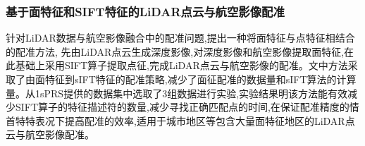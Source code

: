 \documentclass{amsart}
\begin{document}
\subsubsection{基于面特征和SIFT特征的LiDAR点云与航空影像配准}
针对LiDAR数据与航空影像融合中的配准问题,提出一种将面特征与点特征相结合的配准方法,
先由LiDAR点云生成深度影像,对深度影像和航空影像提取面特征,在此基础上采用SIFT算子提取点征,完成LiDAR点云与航空影像的配准。文中方法采取了由面特征到sIFT特征的配准策略,减少了面征配准的数据量和sIFT算法的计算量。从1sPRS提供的数据集中选取了3组数据进行实验,实验结果明该方法能有效减少SIFT算子的特征描述符的数量,减少寻找正确匹配点的时间,在保证配准精度的情 首特特表况下提高配准的效率,适用于城市地区等包含大量面特征地区的LiDAR点云与航空影像配准。
\end{document}
